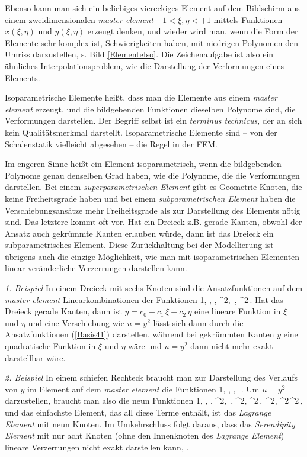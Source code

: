 {Ebenso kann man sich ein beliebiges viereckiges Element auf dem Bildschirm aus einem
zweidimensionalen {\em master element\/} $-1 < \xi,\eta < +1$ mittels Funktionen
$x(\xi,\eta)$ und $y(\xi,\eta)$ erzeugt denken, und wieder wird man, wenn die Form der
Elemente sehr komplex ist, Schwierigkeiten haben, mit niedrigen Polynomen den Umriss
darzustellen, s. Bild \ref{ElementeIso}. Die Zeichenaufgabe ist also ein \"{a}hnliches
Interpolationsproblem, wie die Darstellung der Verformungen eines Elements.

Isoparametrische Elemente hei{\ss}t, dass man die Elemente aus einem {\em master element\/}
erzeugt, und die bildgebenden Funktionen dieselben Polynome sind, die Verformungen
darstellen. Der Begriff selbst ist ein {\em terminus technicus\/}, der an sich kein
Qualit\"{a}tsmerkmal darstellt. Isoparametrische Elemente sind -- von der Schalenstatik
vielleicht abgesehen -- die Regel in der FEM.

Im engeren Sinne hei{\ss}t ein Element isoparametrisch, wenn die bildgebenden Polynome genau
denselben Grad haben, wie die Polynome, die die Verformungen darstellen. Bei einem {\em
superparametrischen Element\/} gibt es
Geometrie-Knoten, die keine Freiheitsgrade haben und bei einem {\em subparametrischen
Element\/} haben die Verschiebungsans\"{a}tze mehr
Freiheitsgrade als zur Darstellung des Elements n\"{o}tig sind. Das letztere kommt oft vor.
Hat ein Dreieck z.B. gerade Kanten, obwohl der Ansatz auch gekr\"{u}mmte Kanten erlauben
w\"{u}rde, dann ist das Dreieck ein subparametrisches Element. Diese Zur\"{u}ckhaltung bei der
Modellierung ist \"{u}brigens auch die einzige M\"{o}glichkeit, wie man mit isoparametrischen
Elementen linear ver\"{a}nderliche Verzerrungen darstellen kann.

{\em 1. Beispiel\/} In einem Dreieck mit sechs Knoten sind die Ansatzfunktionen auf dem
{\em master element\/} Linearkombinationen der Funktionen
\bfo\label{Basis41}
1, \xi, \eta, \xi^2, \xi\,\eta, \eta^2\,.
\efo
Hat das Dreieck gerade Kanten, dann ist $y = c_0 + c_1\,\xi + c_2\,\eta$ eine lineare
Funktion in $\xi$ und $\eta$ und eine Verschiebung wie $u = y^2$ l\"{a}sst sich dann durch
die Ansatzfunktionen (\ref{Basis41}) darstellen, w\"{a}hrend bei gekr\"{u}mmten Kanten $y$ eine
quadratische Funktion in $\xi$ und $\eta$ w\"{a}re und $u = y^2$ dann nicht mehr exakt
darstellbar w\"{a}re.

{\em 2. Beispiel\/} In einem schiefen Rechteck braucht man zur Darstellung des Verlaufs
von $y$ im Element auf dem {\em master element\/} die Funktionen
\bfo\label{Basis241}
1, \xi, \eta, \xi\,\eta\,.
\efo
Um $u = y^2$ darzustellen, braucht man also die neun Funktionen
\bfo\label{Basis341}
1, \xi, \eta, \xi^2, \xi\,\eta, \eta^2, \xi^2\,\eta, \xi\,\eta^2, \xi^2\,\eta^2\,,
\efo
und das einfachste Element, das all diese Terme enth\"{a}lt, ist das {\em Lagrange
Element\/} mit neun Knoten. Im Umkehrschluss folgt daraus, dass das {\em Serendipity
Element\/} mit nur acht Knoten (ohne den Innenknoten des {\em Lagrange Element\/})
lineare Verzerrungen nicht exakt darstellen kann, \cite{MacNeal}.

}
